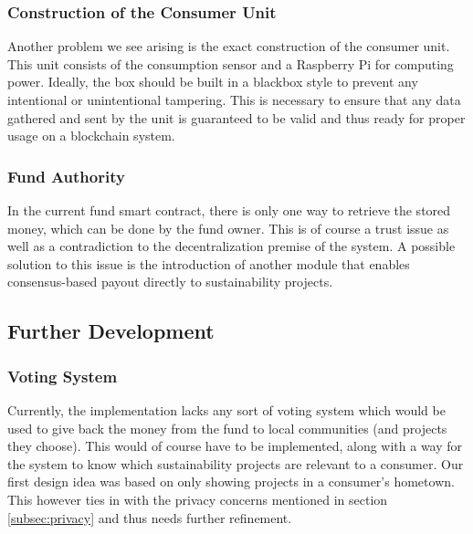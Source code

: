 \documentclass[11pt]{article}
\begin{document}
\subsubsection{Construction of the Consumer Unit}
Another problem we see arising is the exact construction of the consumer unit. This unit consists of the consumption sensor and a Raspberry Pi for computing power. Ideally, the box should be built in a blackbox style to prevent any intentional or unintentional tampering. This is necessary to ensure that any data gathered and sent by the unit is guaranteed to be valid and thus ready for proper usage on a blockchain system.
\subsubsection{Fund Authority}
In the current fund smart contract, there is only one way to retrieve the stored money, which can be done by the fund owner. This is of course a trust issue as well as a contradiction to the decentralization premise of the system. A possible solution to this issue is the introduction of another module that enables consensus-based payout directly to sustainability projects.

\subsection{Further Development}
\subsubsection{Voting System}
Currently, the implementation lacks any sort of voting system which would be used to give back the money from the fund to local communities (and projects they choose). This would of course have to be implemented, along with a way for the system to know which sustainability projects are relevant to a consumer. Our first design idea was based on only showing projects in a consumer's hometown. This however ties in with the privacy concerns mentioned in section \ref{subsec:privacy} and thus needs further refinement. 
\end{document}
